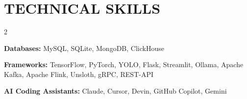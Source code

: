 \section*{TECHNICAL SKILLS}
\begin{multicols}{2}
\raggedright
{}\par\vspace{4pt}
{\headingfont\bfseries\color{navy}Databases: }{\normalfont\color{bodytext}MySQL, SQLite, MongoDB, ClickHouse}\par\vspace{4pt}
{\headingfont\bfseries\color{navy}Frameworks: }{\normalfont\color{bodytext}TensorFlow, PyTorch, YOLO, Flask, Streamlit, Ollama, Apache Kafka, Apache Flink, Unsloth, gRPC, REST-API}\par\vspace{4pt}
{\headingfont\bfseries\color{navy}AI Coding Assistants: }{\normalfont\color{bodytext}Claude, Cursor, Devin, GitHub Copilot, Gemini}
\end{multicols}

